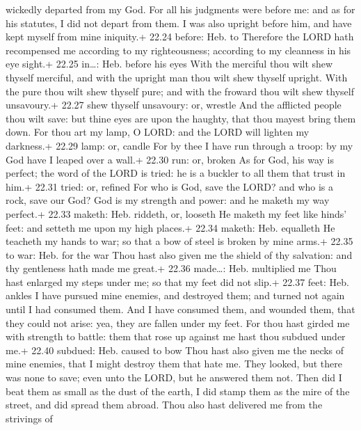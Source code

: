 wickedly departed from my God.  For all his judgments were
before me: and as for his statutes, I did not depart from them.
 I was also upright before him, and have kept myself from
mine iniquity.+ 22.24 before: Heb. to  Therefore the LORD
hath recompensed me according to my righteousness; according to my
cleanness in his eye sight.+ 22.25 in\ldots: Heb. before his eyes
 With the merciful thou wilt shew thyself merciful, and
with the upright man thou wilt shew thyself upright.  With
the pure thou wilt shew thyself pure; and with the froward thou wilt
shew thyself unsavoury.+ 22.27 shew thyself unsavoury: or, wrestle
 And the afflicted people thou wilt save: but thine eyes
are upon the haughty, that thou mayest bring them down. 
For thou art my lamp, O LORD: and the LORD will lighten my darkness.+
22.29 lamp: or, candle  For by thee I have run through a
troop: by my God have I leaped over a wall.+ 22.30 run: or, broken
 As for God, his way is perfect; the word of the LORD is
tried: he is a buckler to all them that trust in him.+ 22.31 tried: or,
refined  For who is God, save the LORD? and who is a rock,
save our God?  God is my strength and power: and he maketh
my way perfect.+ 22.33 maketh: Heb. riddeth, or, looseth 
He maketh my feet like hinds' feet: and setteth me upon my high places.+
22.34 maketh: Heb. equalleth  He teacheth my hands to war;
so that a bow of steel is broken by mine arms.+ 22.35 to war: Heb. for
the war  Thou hast also given me the shield of thy
salvation: and thy gentleness hath made me great.+ 22.36 made\ldots:
Heb. multiplied me  Thou hast enlarged my steps under me;
so that my feet did not slip.+ 22.37 feet: Heb. ankles  I
have pursued mine enemies, and destroyed them; and turned not again
until I had consumed them.  And I have consumed them, and
wounded them, that they could not arise: yea, they are fallen under my
feet.  For thou hast girded me with strength to battle:
them that rose up against me hast thou subdued under me.+ 22.40 subdued:
Heb. caused to bow  Thou hast also given me the necks of
mine enemies, that I might destroy them that hate me.  They
looked, but there was none to save; even unto the LORD, but he answered
them not.  Then did I beat them as small as the dust of the
earth, I did stamp them as the mire of the street, and did spread them
abroad.  Thou also hast delivered me from the strivings of
